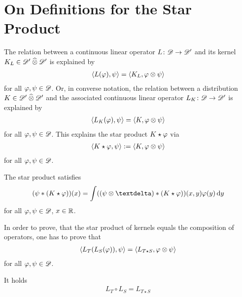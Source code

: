 \section{On Definitions for the Star Product}

The relation between a continuous linear operator
$ L \colon \mathscr{  D  } \to \mathscr{  D  }' $ and its kernel $ K_L \in \mathscr{  D  }' \mathbin{\widehat{\otimes}} \mathscr{  D  }' $
is explained by
\begin{align}
    \langle  L(\varphi)  ,  \psi  \rangle
    =
    \langle  K_L  ,  \varphi \otimes \psi  \rangle
\end{align}
for all $ \varphi,\psi \in \mathscr{  D  } $.
Or, in converse notation, the relation between a distribution
$ K \in \mathscr{  D  }' \mathbin{\widehat{\otimes}} \mathscr{  D  }' $ and the associated
continuous linear operator $ L_K \colon \mathscr{  D  } \to \mathscr{  D  }' $
is explained by
\begin{align}
    \langle  L_K( \varphi )  ,  \psi  \rangle
    =
    \langle  K  ,  \varphi \otimes \psi  \rangle
\end{align}
for all $ \varphi,\psi \in \mathscr{  D  } $.
This explains the star product $ K \star \varphi $ via
\begin{align}
    \langle  K \star \varphi  ,  \psi  \rangle
    :=
    \langle  K  ,  \varphi \otimes \psi  \rangle
\end{align}
for all $ \varphi,\psi \in \mathscr{  D  } $.

The star product satisfies
\begin{align}
    ( \ps * ( K \star \ph ) )( x )
    =
    \int ( ( \ps \tepro \sfdeo ) * ( K \star \ph ) )(x,y) \ph(y) \intd{y}
\end{align}
for all $ \varphi,\psi \in \mathscr{  D  } $, $ x \in \mathbb{ R } $.

In order to prove, that the star product of kernels
equals the composition of operators,
one has to prove that
\begin{align}
    \langle  L_T( L_S( \varphi ) )  ,  \psi  \rangle
    =
    \langle  L_{T\star S}  ,  \varphi \otimes \psi  \rangle
\end{align}
for all $ \varphi,\psi \in \mathscr{  D  } $.

It holds
\begin{align}
    L_T \circ L_S
    =
    L_{T \star S}
\end{align}


